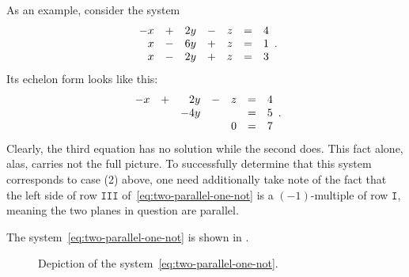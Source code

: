 As an example, consider the system
\begin{equation}
 \label{eq:two-parallel-one-not}
 \begin{array}{r c r c r c r}
  -x & + & 2y & - & z & = & 4\\
  x & - & 6y & + & z & = & 1\\
  x & - & 2y & + & z & = & 3
 \end{array}.
\end{equation}
Its echelon form looks like this:
\[
 \begin{array}{r c r c r c r}
  -x & + & 2y & - & z & = & 4\\
     & & -4y & & & = & 5\\
     & & & & 0 & = & 7
 \end{array}.
\]
Clearly, the third equation has no solution while the second does. This fact
alone, alas, carries not the full picture. To successfully determine that this
system corresponds to case (2) above, one need additionally take note of the
fact that the left side of row $\mathtt{III}$ of~\eqref{eq:two-parallel-one-not}
is a $(-1)$-multiple of row $\mathtt{I}$, meaning the two planes in question are
parallel.

The system~\eqref{eq:two-parallel-one-not} is shown in
.
\begin{figure}[ht]
 \centering

 \caption{Depiction of the system~\eqref{eq:two-parallel-one-not}.}
 \label{fig:two-parallel-one-not}
\end{figure}

